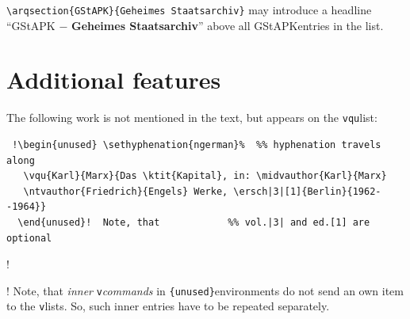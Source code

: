 \documentclass[12pt,a4paper]{article}
\newcommand{\pbs}{\string\ \unskip}
\newcommand{\bs}{\protect\pbs}
\renewcommand{\{}{{\normalfont\lbashortmem}}
\renewcommand{\}}{{\normalfont\rbashortmem}}
\begin{document}
\let\mempertitlename=\epertitlename
\renewcommand{\epertitlename}{\texttt{\bs printper} \ \mempertitlename}
\vspace{-.5ex}\printper

\renewcommand{\epertitlename}{\texttt{\bs printnumper} \ \mempertitlename}
\vspace{-.5ex}\printnumper

\let\memarqtitlename=\earqtitlename
\renewcommand{\earqtitlename}{\texttt{\bs printarq} \ \memarqtitlename}
\vspace{-.5ex}\printarq {}

\renewcommand{\earqtitlename}{\texttt{\bs printnumarq} \ \memarqtitlename}
\vspace{-.5ex}\printnumarq

\vspace{2ex}\noindent
\verb|\arqsection{GStAPK}{Geheimes Staatsarchiv}| may introduce 
a headline ``\textsf{GStAPK} $-$ \textbf{Geheimes Staatsarchiv}'' 
above all GStAPK\fhy entries in the list.


\newpage
\section{Additional features}

The following work is not mentioned in the text, but appears on the \texttt{vqu}\hy list:

\vspace{-1.1ex}
{\footnotesize\begin{verbatim}
 !\begin{unused} \sethyphenation{ngerman}%  %% hyphenation travels along
   \vqu{Karl}{Marx}{Das \ktit{Kapital}, in: \midvauthor{Karl}{Marx}
   \ntvauthor{Friedrich}{Engels} Werke, \ersch|3|[1]{Berlin}{1962--1964}}
  \end{unused}!  Note, that            %% vol.|3| and ed.[1] are optional
\end{verbatim}}

\vspace{-1.25ex}\noindent
 !\begin{unused} %
  \end{unused}!  Note, that          %
\textit{inner} \texttt{v}\textit{\fhy commands} in \verb|{unused}|\hy environments
do not send an own item to the \texttt{v}\fhy lists. So, such inner entries
have to be repeated separately.
\end{document}
